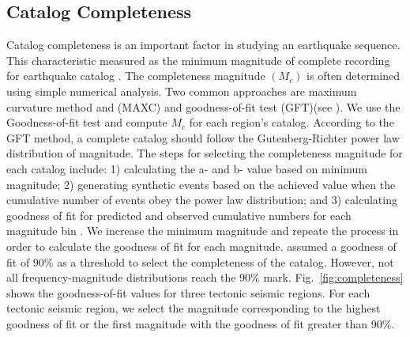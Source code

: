  
\subsection{Catalog Completeness}
\noindent
Catalog completeness is an important factor in studying an earthquake sequence. This characteristic measured as the minimum magnitude of complete recording for earthquake catalog . The completeness magnitude $(M_c)$ is often determined using simple numerical analysis. Two common approaches are maximum curvature method and (MAXC) and goodness-of-fit test (GFT)(see \citet{Wiemer2000}). We use the Goodness-of-fit test and compute $M_c$ for each region's catalog. According to the GFT method, a complete catalog should follow the Gutenberg-Richter power law distribution of magnitude. The steps for selecting the completeness magnitude for each catalog include: 1) calculating the a-  and  b-  value based on minimum magnitude; 2) generating  synthetic events based on the achieved value when the cumulative number of events obey the power law distribution; and 3) calculating goodness of fit for predicted and observed cumulative numbers for each magnitude bin  \citep{Wiemer2000}. We increase the minimum magnitude and repeate the process in order to calculate the goodness of fit for each magnitude.  \citet{Wiemer2000} assumed a goodness of fit of 90\% as a threshold to select the completeness of the catalog. However,  not all frequency-magnitude distributions reach the 90\% mark. Fig.~\ref{fig:completeness} shows the goodness-of-fit values for three tectonic seismic regions. For each tectonic seismic region, we select the magnitude corresponding to the highest goodness of fit or the first magnitude with the goodness of fit greater than 90\%.

